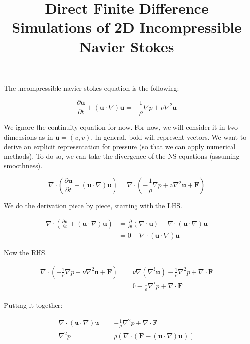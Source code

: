 \documentclass[12pt]{article}
\begin{document}
\title{Direct Finite Difference Simulations of 2D Incompressible Navier Stokes}
\maketitle

The incompressible navier stokes equation is the following:

\begin{equation}
    \frac{\partial \mathbf{u}}{\partial t} + (\mathbf{u} \cdot \nabla)\mathbf{u} = -\frac{1}{\rho}\nabla p + \nu \nabla^2 \mathbf{u}
\end{equation}

We ignore the continuity equation for now. For now, we will consider it in two dimensions as in $\mathbf{u} = (u, v)$. In general, bold will represent vectors. We want to derive an explicit representation for pressure (so that we can apply numerical methods). To do so, we can take the divergence of the NS equations (assuming smoothness).

\begin{equation}
    \nabla \cdot (\frac{\partial \mathbf{u}}{\partial t} + (\mathbf{u} \cdot \nabla)\mathbf{u}) = \nabla \cdot (-\frac{1}{\rho}\nabla p + \nu \nabla^2 \mathbf{u} + \mathbf{F})
\end{equation}

We do the derivation piece by piece, starting with the LHS.

\begin{align*}
    \nabla \cdot (\frac{\partial \mathbf{u}}{\partial t} + (\mathbf{u} \cdot \nabla)\mathbf{u}) &= \frac{\partial}{\partial t}(\nabla \cdot \mathbf{u}) + \nabla \cdot (\mathbf{u} \cdot \nabla) \mathbf{u} \\
    &= 0 + \nabla \cdot (\mathbf{u} \cdot \nabla) \mathbf{u}
\end{align*}

Now the RHS.

\begin{align*}
    \nabla \cdot (-\frac{1}{\rho}\nabla p + \nu \nabla^2 \mathbf{u} + \mathbf{F}) &= \nu \nabla(\nabla^2 \mathbf{u}) - \frac{1}{\rho}\nabla^2 p + \nabla \cdot \mathbf{F} \\
    &= 0 - \frac{1}{\rho}\nabla^2 p + \nabla \cdot \mathbf{F}
\end{align*}

Putting it together:

\begin{align*}
\nabla \cdot (\mathbf{u} \cdot \nabla) \mathbf{u} &= - \frac{1}{\rho}\nabla^2 p + \nabla \cdot \mathbf{F} \\
\nabla^2 p &= \rho(\nabla \cdot (\mathbf{F} - (\mathbf{u} \cdot \nabla) \mathbf{u}))
\end{align*}
\end{document}

